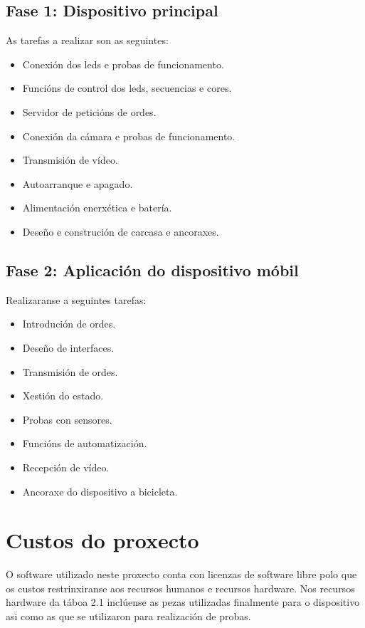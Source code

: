 \subsection{Fase 1: Dispositivo principal}
As tarefas a realizar son as seguintes:
\begin{itemize}
    \item Conexión dos leds e probas de funcionamento.
    \item Funcións de control dos leds, secuencias e cores.
    \item Servidor de peticións de ordes.
    \item Conexión da cámara e probas de funcionamento.
    \item Transmisión de vídeo.
    \item Autoarranque e apagado.
    \item Alimentación enerxética e batería.
    \item Deseño e construción de carcasa e ancoraxes.
\end{itemize}
\subsection{Fase 2: Aplicación do dispositivo móbil}
Realizaranse a seguintes tarefas:
\begin{itemize}

    \item Introdución de ordes.
    \item Deseño de interfaces.
    \item Transmisión de ordes.
    \item Xestión do estado.
    \item Probas con sensores.
    \item Funcións de automatización.
    \item Recepción de vídeo.
    \item Ancoraxe do dispositivo a bicicleta.
\end{itemize}

\section{Custos do proxecto}
O software utilizado neste proxecto conta con licenzas de software libre polo que os custos restrinxiranse aos recursos humanos e recursos hardware.
Nos recursos hardware da táboa 2.1 inclúense as pezas utilizadas finalmente para o dispositivo asi como as que se utilizaron para realización de probas.

